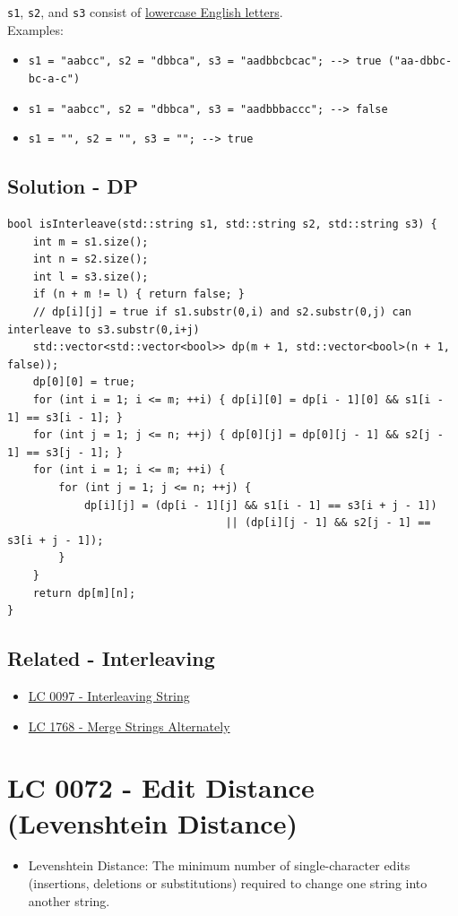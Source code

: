 {\colorbox{CodeBackground}{\lstinline|s1|}}, {\colorbox{CodeBackground}{\lstinline|s2|}}, and {\colorbox{CodeBackground}{\lstinline|s3|}} consist of \ul{lowercase English letters}.\\

Examples:
\begin{itemize}
	\item {\colorbox{CodeBackground}{\lstinline|s1 = "aabcc", s2 = "dbbca", s3 = "aadbbcbcac"; --> true ("aa-dbbc-bc-a-c")|}}
	\item {\colorbox{CodeBackground}{\lstinline|s1 = "aabcc", s2 = "dbbca", s3 = "aadbbbaccc"; --> false|}}
	\item {\colorbox{CodeBackground}{\lstinline|s1 = "", s2 = "", s3 = ""; --> true|}}
\end{itemize}

\subsection*{Solution - DP}
\begin{lstlisting}
bool isInterleave(std::string s1, std::string s2, std::string s3) {
	int m = s1.size();
	int n = s2.size();
	int l = s3.size();
	if (n + m != l) { return false; }
	// dp[i][j] = true if s1.substr(0,i) and s2.substr(0,j) can interleave to s3.substr(0,i+j)
	std::vector<std::vector<bool>> dp(m + 1, std::vector<bool>(n + 1, false));
	dp[0][0] = true;
	for (int i = 1; i <= m; ++i) { dp[i][0] = dp[i - 1][0] && s1[i - 1] == s3[i - 1]; }
	for (int j = 1; j <= n; ++j) { dp[0][j] = dp[0][j - 1] && s2[j - 1] == s3[j - 1]; }
	for (int i = 1; i <= m; ++i) {
		for (int j = 1; j <= n; ++j) {
			dp[i][j] = (dp[i - 1][j] && s1[i - 1] == s3[i + j - 1])
								  || (dp[i][j - 1] && s2[j - 1] == s3[i + j - 1]);
		}
	}
	return dp[m][n];
}
\end{lstlisting}

\subsection*{Related - Interleaving}
\begin{itemize}
\item \hyperref[lc0097]{LC 0097 - Interleaving String}
\item \hyperref[lc1768]{LC 1768 - Merge Strings Alternately}
\end{itemize}

\section{LC 0072 - Edit Distance (Levenshtein Distance)}
\begin{tcolorbox}
\begin{itemize}
\item Levenshtein Distance: The minimum number of single-character edits (insertions, deletions or substitutions) required to change one string into another string.
\end{itemize}
\end{tcolorbox}

